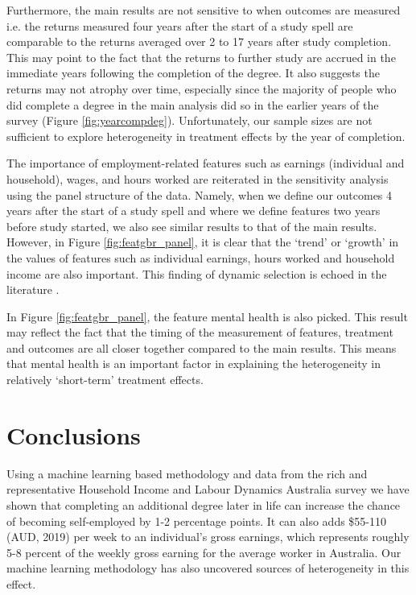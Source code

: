 \documentclass[12pt, a4paper]{article}
\begin{document}
Furthermore, the main results are not sensitive to when outcomes are measured
i.e. the returns measured four years after the start of a study spell are
comparable to the returns averaged over 2 to 17 years after study completion.
This may point to the fact that the returns to further study are accrued in the
immediate years following the completion of the degree. It also suggests the
returns may not atrophy over time, especially since the majority of people who
did complete a degree in the main analysis did so in the earlier years of the
survey (Figure \ref{fig:yearcompdeg}). Unfortunately, our sample sizes are not
sufficient to explore heterogeneity in treatment effects by the year of
completion. 

The importance of employment-related features such as earnings (individual and
household), wages, and hours worked are reiterated in the sensitivity analysis
using the panel structure of the data. Namely, when we define our outcomes 4
years after the start of a study spell and where we define features two years
before study started, we also see similar results to that of the main results.
However, in Figure \ref{fig:featgbr_panel}, it is clear that the `trend' or
`growth' in the values of features such as individual earnings, hours worked
and household income are also important. This finding of dynamic selection is
echoed in the literature \citep{jacobson2005, dynarski2016, dynarski2018}. 

In Figure \ref{fig:featgbr_panel}, the feature mental health is also picked.
This result may reflect the fact that the timing of the measurement of
features, treatment and outcomes are all closer together compared to the main
results. This means that mental health is an important factor in explaining the
heterogeneity in relatively `short-term' treatment effects. 


\section{Conclusions}

Using a machine learning based methodology and data from the rich and
representative Household Income and Labour Dynamics Australia survey we have
shown that completing an additional degree later in life can increase the chance of becoming self-employed by 1-2 percentage points. It can also adds \$55-110 (AUD,
2019) per week to an individual's gross earnings, which represents roughly 5-8
percent of the weekly gross earning for the average worker in Australia. Our
machine learning methodology has also uncovered sources of heterogeneity in
this effect.
\end{document}
